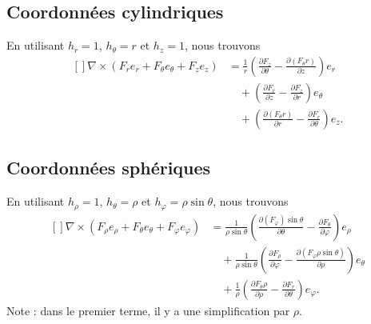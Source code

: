 \subsection{Coordonnées cylindriques}

En utilisant $h_r=1$, $h_{\theta}=r$ et $h_z=1$, nous trouvons
\begin{equation}        \label{EqRotationnelCylin}
    \begin{aligned}[]
        \nabla\times(F_re_r+F_{\theta}e_{\theta}+F_ze_z)&=\frac{1}{ r }\left( \frac{ \partial F_z }{ \partial \theta }-\frac{ \partial (F_{\theta}r) }{ \partial z } \right)e_r\\
        &\quad+\left( \frac{ \partial F_r }{ \partial z }-\frac{ \partial F_z }{ \partial r } \right)e_{\theta}\\
        &\quad+\left( \frac{ \partial (F_{\theta} r) }{ \partial r }-\frac{ \partial F_r }{ \partial \theta } \right)e_z.
    \end{aligned}
\end{equation}

\subsection{Coordonnées sphériques}

En utilisant $h_{\rho}=1$, $h_{\theta}=\rho$ et $h_{\varphi}=\rho\sin\theta$, nous trouvons
\begin{equation}
    \begin{aligned}[]
        \nabla\times(F_{\rho}e_{\rho}+F_{\theta}e_{\theta}+F_{\varphi}e_{\varphi})&=\frac{1}{ \rho\sin\theta }\left( \frac{ \partial (F_{\varphi})\sin\theta }{ \partial \theta }-\frac{ \partial F_{\theta} }{ \partial \varphi } \right)e_{\rho}\\
        &\quad+\frac{1}{ \rho\sin\theta }\left( \frac{ \partial F_{\rho} }{ \partial \varphi }-\frac{ \partial (F_{\varphi}\rho\sin\theta) }{ \partial \rho } \right)e_{\theta}\\
        &\quad+\frac{1}{ \rho }\left( \frac{ \partial F_{\theta}\rho }{ \partial \rho }-\frac{ \partial F_r }{ \partial \theta } \right)e_{\varphi}.
    \end{aligned}
\end{equation}
Note : dans le premier terme, il y a une simplification par $\rho$.


